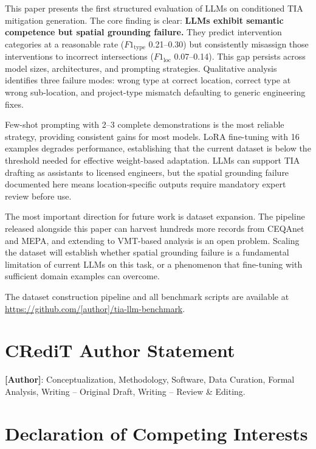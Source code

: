 \documentclass[preprint,12pt]{elsarticle}
\begin{document}
This paper presents the first structured evaluation of LLMs on conditioned
TIA mitigation generation.
The core finding is clear: \textbf{LLMs exhibit semantic competence but
spatial grounding failure.}
They predict intervention categories at a reasonable rate
($F1_\text{type}$ 0.21--0.30) but consistently misassign those interventions
to incorrect intersections ($F1_\text{loc}$ 0.07--0.14).
This gap persists across model sizes, architectures, and prompting strategies.
Qualitative analysis identifies three failure modes: wrong type at correct
location, correct type at wrong sub-location, and project-type mismatch
defaulting to generic engineering fixes.

Few-shot prompting with 2--3 complete demonstrations is the most reliable
strategy, providing consistent gains for most models.
LoRA fine-tuning with 16 examples degrades performance, establishing that
the current dataset is below the threshold needed for effective weight-based
adaptation.
LLMs can support TIA drafting as assistants to licensed engineers, but the
spatial grounding failure documented here means location-specific outputs
require mandatory expert review before use.

The most important direction for future work is dataset expansion.
The pipeline released alongside this paper can harvest hundreds more records
from CEQAnet and MEPA, and extending to VMT-based analysis is an open problem.
Scaling the dataset will establish whether spatial grounding failure is a
fundamental limitation of current LLMs on this task, or a phenomenon that
fine-tuning with sufficient domain examples can overcome.

The dataset construction pipeline and all benchmark scripts are available
at \url{https://github.com/[author]/tia-llm-benchmark}.

\section*{CRediT Author Statement}

\textbf{[Author]}: Conceptualization, Methodology, Software, Data Curation,
Formal Analysis, Writing -- Original Draft, Writing -- Review \& Editing.

\section*{Declaration of Competing Interests}
\end{document}
